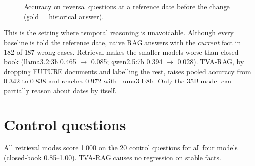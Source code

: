 \documentclass[11pt,a4paper]{report}
\begin{document}
\begin{figure}[htbp]\centering
{}
\caption{Accuracy on reversal questions at a reference date before the change (gold = historical answer).}
\end{figure}

This is the setting where temporal reasoning is unavoidable. Although every baseline is told the reference date, naive RAG answers with the \emph{current} fact in 182 of 187 wrong cases. Retrieval makes the smaller models worse than closed-book (llama3.2:3b 0.465 $\to$ 0.085; qwen2.5:7b 0.394 $\to$ 0.028). TVA-RAG, by dropping FUTURE documents and labelling the rest, raises pooled accuracy from 0.342 to 0.838 and reaches 0.972 with llama3.1:8b. Only the 35B model can partially reason about dates by itself.

\section{Control questions}
All retrieval modes score 1.000 on the 20 control questions for all four models (closed-book 0.85--1.00). TVA-RAG causes no regression on stable facts.
\end{document}
